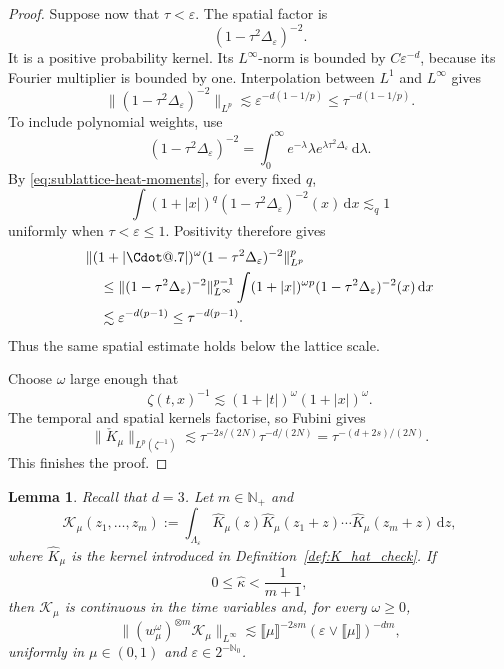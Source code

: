 \documentclass{article}
\makeatletter
\numberwithin{equation}{section}
\newcommand{\assign}{:=}
\newcommand{\mathd}{\mathrm{d}}
\newcommand*\Cdot{{\mathpalette\Cdot@{.7}}}
\newcommand*\Cdot@[2]{\mathbin{\vcenter{\hbox{\scalebox{#2}{\hspace{0.1mm}$\m@th#1\bullet$\hspace{0.1mm}}}}}}
\theoremstyle{plain}
\newtheorem{lemma}[theorem]{Lemma}
\theoremstyle{definition}
\makeatother
\begin{document}
\begin{proof}
	Suppose now that \(\tau<\varepsilon\).  The spatial factor is
	\[
	(1-\tau^2\Delta_\varepsilon)^{-2}.
	\]
	It is a positive probability kernel.  Its \(L^\infty\)-norm is bounded by
	\(C\varepsilon^{-d}\), because its Fourier multiplier is bounded by one.
	Interpolation between \(L^1\) and \(L^\infty\) gives
	\[
	\|(1-\tau^2\Delta_\varepsilon)^{-2}\|_{L^p}
	\lesssim
	\varepsilon^{-d(1-1/p)}
	\leq
	\tau^{-d(1-1/p)}.
	\]
	To include polynomial weights, use
	\[
	(1-\tau^2\Delta_\varepsilon)^{-2}
	=
	\int_0^\infty e^{-\lambda}\lambda
	e^{\lambda\tau^2\Delta_\varepsilon}\,\mathd\lambda.
	\]
	By \eqref{eq:sublattice-heat-moments}, for every fixed \(q\),
	\[
	\int(1+|x|)^q
	(1-\tau^2\Delta_\varepsilon)^{-2}(x)\,\mathd x
	\lesssim_q 1
	\]
	uniformly when \(\tau<\varepsilon\leq1\).  Positivity therefore gives
	\[
	\begin{aligned}
		&\|(1+|\Cdot|)^\omega
		(1-\tau^2\Delta_\varepsilon)^{-2}
		\|_{L^p}^p
		\\
		&\quad\leq
		\|(1-\tau^2\Delta_\varepsilon)^{-2}\|_{L^\infty}^{p-1}
		\int(1+|x|)^{\omega p}
		(1-\tau^2\Delta_\varepsilon)^{-2}(x)\,\mathd x
		\\
		&\quad\lesssim
		\varepsilon^{-d(p-1)}
		\leq
		\tau^{-d(p-1)}.
	\end{aligned}
	\]
	Thus the same spatial estimate holds below the lattice scale.
	
	Choose \(\omega\) large enough that
	\[
	\zeta(t,x)^{-1}
	\lesssim
	(1+|t|)^\omega(1+|x|)^\omega.
	\]
	The temporal and spatial kernels factorise, so Fubini gives
	\[
	\|\check K_\mu\|_{L^p(\zeta^{-1})}
	\lesssim
	\tau^{-2s/(2N)}\tau^{-d/(2N)}
	=
	\tau^{-(d+2s)/(2N)}.
	\]
	This finishes the proof.
\end{proof}

\begin{lemma}
	\label{lem:hat-K-factor}
	Recall that \(d=3\).  Let \(m\in\mathbb N_+\) and
	\begin{equation}
		\label{eq:cal-K-factor}
		\mathcal K_\mu(z_1,\ldots,z_m)
		\assign
		\int_{\Lambda_\varepsilon}
		\hat K_\mu(z)\hat K_\mu(z_1+z)\cdots
		\hat K_\mu(z_m+z)\,\mathd z,
	\end{equation}
	where $\hat K_\mu$ is the kernel introduced in Definition~\ref{def:K_hat_check}.
	If
	\[
	0\leq\hat\kappa<\frac1{m+1},
	\]
	then \(\mathcal K_\mu\) is continuous in the time variables and, for every
	\(\omega\geq0\),
	\begin{equation}
		\label{eq:hat-K-piecewise-bound}
		\|
		(w_\mu^\omega)^{\otimes m}\mathcal K_\mu
		\|_{L^\infty}
		\lesssim
		\llbracket\mu\rrbracket^{-2sm}
		(\varepsilon\vee\llbracket\mu\rrbracket)^{-dm},
	\end{equation}
	uniformly in \(\mu\in(0,1)\) and
	\(\varepsilon\in2^{-\mathbb N_0}\).
\end{lemma}
\end{document}

